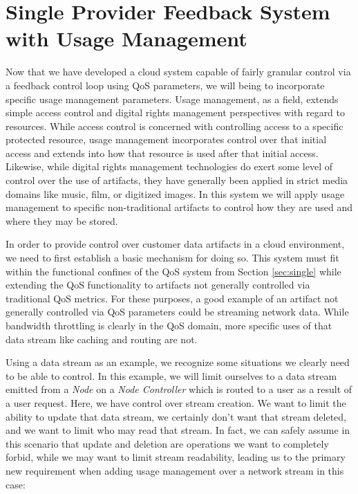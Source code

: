 \documentclass[times, 10pt,twocolumn]{article}
\begin{document}
\section{Single Provider Feedback System with Usage Management}\label{sec:singleUm}
Now that we have developed a cloud system capable of fairly granular control via a feedback control 
loop using QoS parameters, we will being to incorporate specific usage management parameters.  
Usage management, as a field, extends simple access control and digital rights management 
perspectives with regard to resources.  While access control is concerned with controlling access to a 
specific protected resource, usage management incorporates control over that initial access and 
extends into how that resource is used after that initial access.  Likewise, while digital rights 
management technologies do exert some level of control over the use of artifacts, they have generally 
been applied in strict media domains like music, film, or digitized images.  In this system we will 
apply usage management to specific non-traditional artifacts to control how they are used and where 
they may be stored.  

In order to provide control over customer data artifacts in a cloud environment, we need to first 
establish a basic mechanism for doing so.  This system must fit within the functional confines of the 
QoS system from Section \ref{sec:single} while extending the QoS functionality to artifacts not generally 
controlled via traditional QoS metrics.  For these purposes, a good example of an artifact not 
generally controlled via QoS parameters could be streaming network data.  While bandwidth 
throttling is clearly in the QoS domain, more specific uses of that data stream like caching and 
routing are not.  

Using a data stream as an example, we recognize some situations we clearly need to be able to 
control.  In this example, we will limit ourselves to a data stream emitted from a \textit{Node} on a 
\textit{Node Controller} which is routed to a user as a result of a user request.  Here, we have control 
over stream creation.  We want to limit the ability to update that data stream, we certainly don't want 
that stream deleted, and we want to limit who may read that stream.  In fact, we can safely assume in 
this scenario that update and deletion are operations we want to completely forbid, while we may 
want to limit stream readability, leading us to the primary new requirement when adding usage 
management over a network stream in this case:
\end{document}
